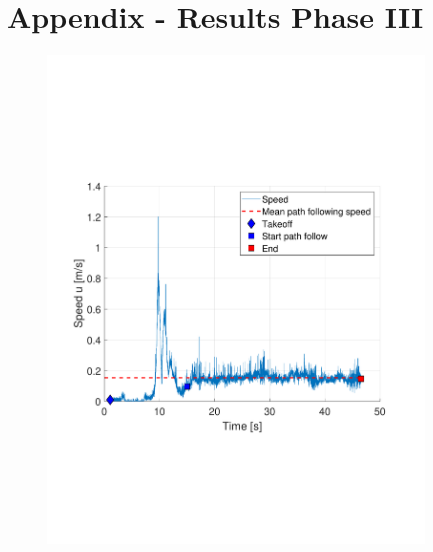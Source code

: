 \documentclass[numbered,pdftex]{ohio-etd}
\begin{document}
\chapter{Appendix - Results Phase III}



\begin{figure}[H]
	\centering
	\includegraphics[trim = 0 150 0 200, clip, width=10cm]{Figures/results/compareFigures/2u}


\end{figure}
\end{document}
